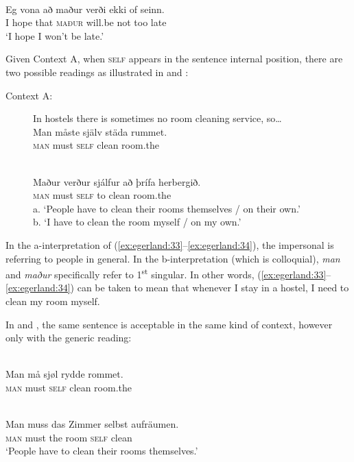 \documentclass[output=paper]{LSP/langsci}
\begin{document}
\ea\label{ex:egerland:32}
\\
\gll Eg   vona    að   maður  verði     ekki   of seinn.\\
I     hope    that   \textsc{maður}  will.be   not   too late\\
\glt ‘I hope I won’t be late.’
\z

Given Context A, when \textsc{self} appears in the sentence internal position, there are two possible readings as illustrated in   and  :

\begin{description}
\item[Context A:] In hostels there is sometimes no room cleaning service, so…
\ea\label{ex:egerland:33}
\\
\gll Man  måste    själv  städa    rummet.\\
\textsc{man}  must    \textsc{self}  clean    room.the\\
\z

\ea\label{ex:egerland:34}
\\
\gll Maður  verður  sjálfur  að  þrífa  herbergið.\\
\textsc{man}    must    \textsc{self}    to  clean  room.the\\
\glt a. ‘People have to clean their rooms themselves / on their own.’\\
     b. ‘I have to clean the room myself / on my own.’
\z
\end{description}


In the a-interpretation of (\ref{ex:egerland:33}--\ref{ex:egerland:34}), the impersonal is referring to people in general. In the b-interpretation (which is colloquial), \textit{man} and \textit{maður} specifically refer to 1\textsuperscript{st} singular. In other words, (\ref{ex:egerland:33}--\ref{ex:egerland:34}) can be taken to mean that whenever I stay in a hostel, I need to clean my room myself.

In  and , the same sentence is acceptable in the same kind of context, however only with the generic reading:

\ea\label{ex:egerland:35}
\\
\gll Man  må  sjøl  rydde    rommet.\\
\textsc{man}  must  \textsc{self}  clean    room.the\\
\z

\ea\label{ex:egerland:36}
\\
\gll Man  muss  das  Zimmer  selbst    aufräumen.\\
\textsc{man}  must  the  room    \textsc{self}    clean\\
\glt ‘People have to clean their rooms themselves.’
\z
\end{document}
